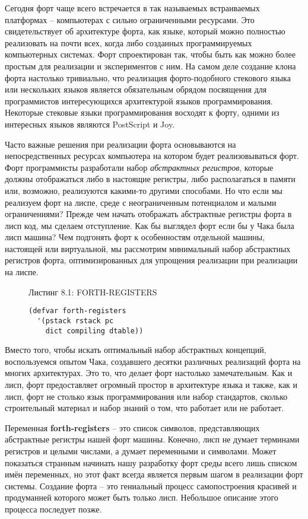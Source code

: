 Сегодня форт чаще всего встречается в так называемых встраиваемых платформах -- компьютерах с сильно ограниченными ресурсами. Это свидетельствует об архитектуре форта, как языке, который можно полностью реализовать на почти всех, когда либо созданных программируемых компьютерных системах. Форт спроектирован так, чтобы быть как можно более простым для реализации и экспериментов с ним. На самом деле создание клона форта настолько тривиально, что реализация форто-подобного стекового языка или нескольких языков является обязательным обрядом посвящения для программистов интересующихся архитектурой языков программирования. Некоторые стековые языки программирования восходят к форту, одними из интересных языков являются PostScript и Joy.

Часто важные решения при реализации форта основываются на непосредственных ресурсах компьютера на котором будет реализовываться форт. Форт программисты разработали набор \emph{абстрактных регистров}, которые должны отображаться либо в настоящие регистры, либо располагаться в памяти или, возможно, реализуются какими-то другими способами. Но что если мы реализуем форт на лиспе, среде с неограниченным потенциалом и малыми ограничениями? Прежде чем начать отображать абстрактные регистры форта в лисп код, мы сделаем отступление. Как бы выглядел форт если бы у Чака была лисп машина? Чем подгонять форт к особенностям отдельной машины, настоящей или виртуальной, мы рассмотрим минимальный набор абстрактных регистров форта, оптимизированных для упрощения реализации при реализации на лиспе.

\begin{figure}Листинг 8.1: FORTH-REGISTERS\label{listing_8.1}
\listbegin
\begin{verbatim}
(defvar forth-registers
  '(pstack rstack pc
    dict compiling dtable))
\end{verbatim}
\listend
\end{figure}

Вместо того, чтобы искать оптимальный набор абстрактных концепций, воспользуемся опытом Чака, создавшего десятки различных реализаций форта на многих архитектурах. Это то, что делает форт настолько замечательным. Как и лисп, форт предоставляет огромный простор в архитектуре языка и также, как и лисп, форт не столько язык программирования или набор стандартов, сколько строительный материал и набор знаний о том, что работает или не работает.

Переменная \textbf{forth-registers} -- это список символов, представляющих абстрактные регистры нашей форт машины. Конечно, лисп не думает терминами регистров и целыми числами, а думает переменными и символами. Может показаться странным начинать нашу разработку форт среды всего лишь списком имён переменных, но этот факт всегда является первым шагом в реализации форт системы. Создание форта -- это гениальный процесс самопостроения красивей и продуманней которого может быть только лисп. Небольшое описание этого процесса последует позже.

